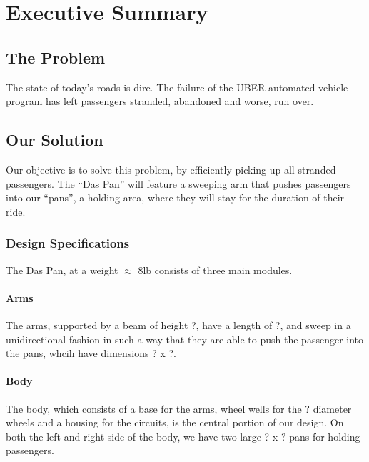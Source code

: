 \documentclass[12pt]{article}
\begin{document}
\begin{titlingpage}
\maketitle 
\begin{abstract}
\end{abstract}
\end{titlingpage}

\tableofcontents
\section{Executive Summary}
\subsection{The Problem}
The state of today’s roads is dire. The failure of the UBER automated vehicle
program has left passengers stranded, abandoned and worse, run over.
\subsection{Our Solution}
Our objective is to solve this problem, by efficiently picking up all stranded
passengers. The “Das Pan” will feature a sweeping arm that pushes
passengers into our “pans”, a holding area, where they will stay for the
duration of their ride.
\subsubsection{Design Specifications}
The Das Pan, at a weight $\approx$ 8lb consists of three main modules. 

\paragraph{Arms}The arms, supported by a beam of height ?, have a length of ?,
and sweep in a unidirectional fashion in such a way that they are able to push
the passenger into the pans, whcih have dimensions ? x ?.

\paragraph{Body} The body, which consists of a base for the arms, wheel wells
for the ? diameter wheels and a housing for the circuits, is the central
portion of our design. On both the left and right side of the body, we have two
large ? x ? pans for holding passengers.
\end{document}
